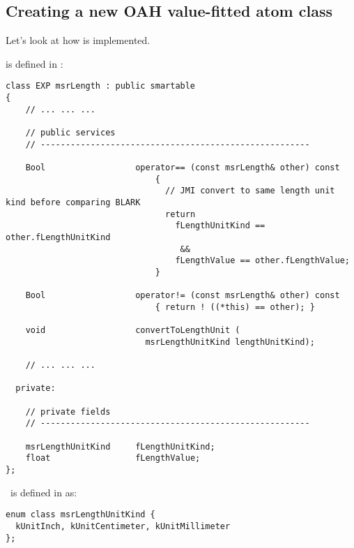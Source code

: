 \subsection{Creating a new OAH value-fitted atom class}

Let's look at how  is implemented.

 is defined in :
\begin{lstlisting}[language=CPlusPlus]
class EXP msrLength : public smartable
{
	// ... ... ...

    // public services
    // ------------------------------------------------------

    Bool                  operator== (const msrLength& other) const
                              {
                                // JMI convert to same length unit kind before comparing BLARK
                                return
                                  fLengthUnitKind == other.fLengthUnitKind
                                   &&
                                  fLengthValue == other.fLengthValue;
                              }

    Bool                  operator!= (const msrLength& other) const
                              { return ! ((*this) == other); }

    void                  convertToLengthUnit (
                            msrLengthUnitKind lengthUnitKind);

	// ... ... ...

  private:

    // private fields
    // ------------------------------------------------------

    msrLengthUnitKind     fLengthUnitKind;
    float                 fLengthValue;
};
\end{lstlisting}

\EnumType\ is defined in  as:
\begin{lstlisting}[language=CPlusPlus]
enum class msrLengthUnitKind {
  kUnitInch, kUnitCentimeter, kUnitMillimeter
};
\end{lstlisting}

